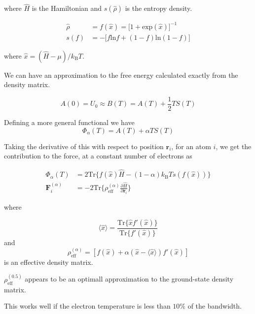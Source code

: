 \documentclass[11pt]{article}
\begin{document}
\begin{enumerate}
where \(\hat{H}\) is the Hamiltonian and \(s(\hat{\rho})\) is the entropy density.

\begin{LaTeX}
\begin{align}
\hat{\rho} &= f(\hat{x}) = \big[ 1 + \text{exp}(\hat{x}) \big]^{-1} \\
s(f) &= - \big[ f\text{ln}f + (1-f)\text{ln}(1-f) \big] 
\end{align}
\end{LaTeX}

where \(\hat{x} = ( \hat{H} - \mu )/k_{\text{B}} T\).

We can have an approximation to the free energy calculated exactly from the
density matrix.

\[
A(0) = U_{0} \approx B(T) = A(T) + \frac{1}{2} T S(T)
\]

Defining a more general functional we have 
\[
\Phi_{\alpha}(T) = A(T) + \alpha T S(T)
\]

Taking the derivative of this with respect to position \(\mathbf{r}_i\), for an
atom \(i\), we get the contribution to the force, at a constant number of
electrons as 

\begin{LaTeX}
\begin{align}
\Phi_{\alpha}(T) &= 2 \text{Tr}\{ f(\hat{x}) \hat{H} - (1 - \alpha) k_{\text{B}} T s( f( \hat{x} ) )  \}\\
\mathbf{F}^{(\alpha)}_{i} &= -2 \text{Tr}\Big\{ \rho_{\text{eff}}^{(\alpha)} \frac{\partial \hat{H} }{ \partial \mathbf{r}_{i} } \Big\} 
\end{align}
\end{LaTeX}

where 

\[
\langle \hat{x} \rangle = \frac{ \text{Tr}\{ \hat{x}f'(\hat{x}) \}}{
      \text{Tr}\{ f'(\hat{x}) \} }
\]
and
\[
\rho_{\text{eff}}^{(\alpha)} = [ f(\hat{x}) + \alpha ( \hat{x} - \langle
           \hat{x} \rangle ) f'(\hat{x})]
\]
 is an effective density matrix. 

\(\rho_{\text{eff}}^{(0.5)}\) appears to be an optimall approximation to the
ground-state density matrix. 

This works well if the electron temperature is less than \(10\%\) of the
bandwidth.
\end{enumerate}
\end{document}
